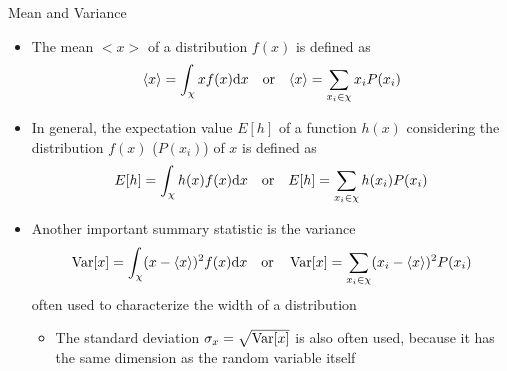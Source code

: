   \begin{frame}{Mean and Variance}
    \begin{itemize}
      \item The mean $<x>$ of a distribution $f(x)$ is defined as
        \begin{equation*}
          \langle x\rangle = \int_\chi xf(x) \mathrm{d}x
          \quad\mathrm{or}\quad
          \langle x\rangle = \sum_{x_i\in\chi} x_iP(x_i)
        \end{equation*}
      \item In general, the expectation value $E[h]$ of a function $h(x)$ considering the distribution $f(x)$ ($P(x_i)$) of $x$ is defined as
        \begin{equation*}
          E[h] = \int_\chi h(x)f(x) \mathrm{d}x
          \quad\mathrm{or}\quad
          E[h] = \sum_{x_i\in\chi} h(x_i)P(x_i)
        \end{equation*}
      \item Another important summary statistic is the variance
        \begin{equation*}
          \operatorname{Var}[x] = \int_\chi (x-\langle x\rangle)^2 f(x) \mathrm{d}x
          \quad\mathrm{or}\quad
          \operatorname{Var}[x] = \sum_{x_i\in\chi} (x_i - \langle x\rangle)^2 P(x_i)
        \end{equation*}
        often used to characterize the width of a distribution
        \begin{itemize}
          \item The standard deviation $\sigma_x = \sqrt{\operatorname{Var}[x]}$ is also often used, because it has the same dimension as the random variable itself
        \end{itemize}
    \end{itemize}
  \end{frame}

